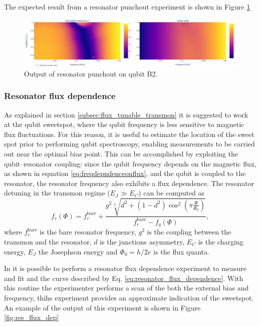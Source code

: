 The expected result from a resonator punchout experiment is shown in Figure \ref{fig:res_punchout}
\begin{figure}[h!]
    \centering
    \includegraphics[width=\textwidth]{figures/png/res_punchout.png}
    \caption{Output of resonator punchout on qubit B2.}
    \label{fig:res_punchout}
\end{figure}

\subsubsection{Resonator flux dependence}
As explained in section \ref{subsec:flux_tunable_transmon} it is suggested to work at the qubit sweetspot, where the qubit frequency is less sensitive to magnetic flux fluctuations.
For this reason, it is useful to estimate the location of the sweet spot prior to performing qubit spectroscopy, enabling measurements to be carried out near the optimal bias point. 
This can be accomplished by exploiting the qubit–resonator coupling: since the qubit frequency depends on the magnetic flux, as shown in equation \ref{eq:freqdepndenceonflux}, and the qubit is coupled to the resonator, the resonator frequency also exhibits a flux dependence. 
The resonator detuning in the transmon regime ($E_J \gg E_C$) can be computed as 
\begin{equation}\label{eq:resonator_flux_dependence}
    f_r(\Phi) = f_r^{\text{bare}} + \frac{g^2 \sqrt[4]{d^2 + (1 - d^2) \cos^2 \left( \pi \frac{\Phi}{\Phi_0} \right)}}{f_r^{\text{bare}} - f_q(\Phi)},
\end{equation}
where $f_r^{\text{bare}}$ is the bare resonator frequency, $g^2$ is the coupling between the transmon and the resonator, $d$ is the junctions asymmetry, $E_C$ is the charging energy, $E_J$ the Josephson energy and $\Phi_0 = h/2e$ is the flux quanta.

In \Qibocal it is possible to perform a resonator flux dependence experiment to measure and fit and the curve described by Eq. \ref{eq:resonator_flux_dependence}.
With this routine the experimenter performs a scan of the both the external bias and frequency, thihs experiment provides an approximate indication of the sweetspot.
An example of the output of this experiment is shown in Figure \ref{fig:res_flux_dep}

